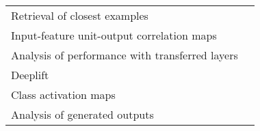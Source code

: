 \begin{tabular}{ll}
Retrieval of closest examples                          &                                                                                                                                                                                  \cite{Deiss2018} \\
Input-feature unit-output correlation maps             &                                                                                                                                                                          \cite{Schirrmeister2017} \\
Analysis of performance with transferred layers        &                                                                                                                                                                            \cite{Hajinoroozi2017} \\
Deeplift                                               &                                                                                                                                                                                \cite{Lawhern2018} \\
Class activation maps                                  &                                                                                                                                                                                  \cite{Ghosh2018} \\
Analysis of generated outputs                          &                                                                                                                                                                               \cite{Hartmann2018} \\
\bottomrule
\end{tabular}
